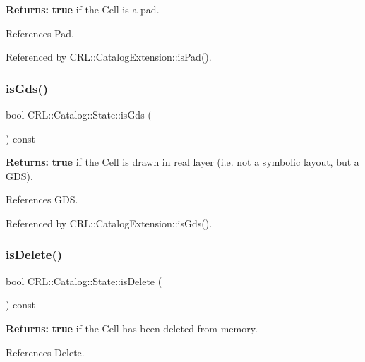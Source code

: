 {\bfseries Returns\+:} {\bfseries true} if the Cell is a pad. 

References Pad.



Referenced by C\+R\+L\+::\+Catalog\+Extension\+::is\+Pad().

\mbox{\label{classCRL_1_1Catalog_1_1State_a7af8d732bf9cea0b0ddb4eca3b0528ec}} 
\subsubsection{\texorpdfstring{is\+Gds()}{isGds()}}
{\footnotesize\ttfamily bool C\+R\+L\+::\+Catalog\+::\+State\+::is\+Gds (\begin{DoxyParamCaption}{ }\end{DoxyParamCaption}) const\hspace{0.3cm}{\ttfamily [inline]}}

{\bfseries Returns\+:} {\bfseries true} if the Cell is drawn in real layer (i.\+e. not a symbolic layout, but a G\+DS). 

References G\+DS.



Referenced by C\+R\+L\+::\+Catalog\+Extension\+::is\+Gds().

\mbox{\label{classCRL_1_1Catalog_1_1State_ac6df038ecb133b973f9b9f2a5e858ca5}} 
\subsubsection{\texorpdfstring{is\+Delete()}{isDelete()}}
{\footnotesize\ttfamily bool C\+R\+L\+::\+Catalog\+::\+State\+::is\+Delete (\begin{DoxyParamCaption}{ }\end{DoxyParamCaption}) const\hspace{0.3cm}{\ttfamily [inline]}}

{\bfseries Returns\+:} {\bfseries true} if the Cell has been deleted from memory. 

References Delete.



